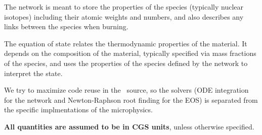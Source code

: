 The network is meant to store the properties of the species (typically
nuclear isotopes) including their atomic weights and numbers, and also
describes any links between the species when burning.  

The equation of state relates the thermodynamic properties of the
material.  It depends on the composition of the material, typically
specified via mass fractions of the species, and uses the properties
of the species defined by the network to interpret the state.

We try to maximize code reuse in the \microphysics\ source, so the
solvers (ODE integration for the network and Newton-Raphson root
finding for the EOS) is separated from the specific implmentations of
the microphysics.

{\bf All quantities are assumed to be in CGS units}, unless otherwise 
specified.
